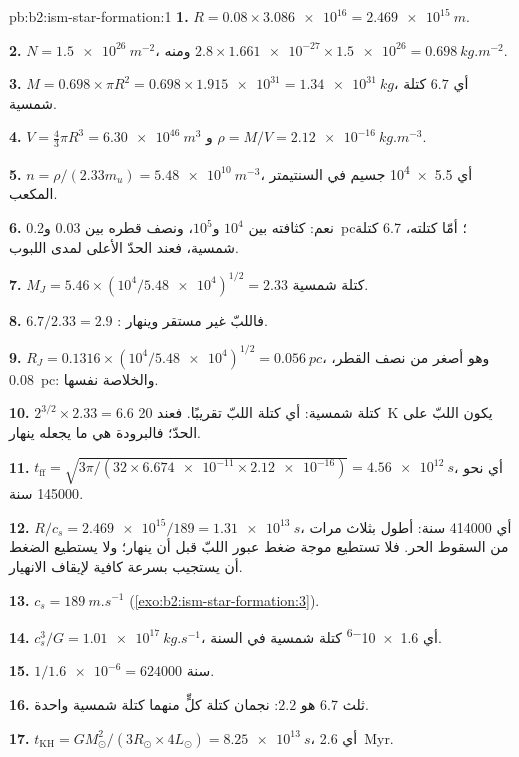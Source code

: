 \begin{solution}{pb:b2:ism-star-formation:1}
\textbf{1.} $R = 0.08\times\num{3.086e16} = \qty{2.469e15}{m}$.

\textbf{2.} $N = \qty{1.5e26}{m^{-2}}$، ومنه $2.8\times\num{1.661e-27}\times\num{1.5e26} =
\qty{0.698}{kg.m^{-2}}$.

\textbf{3.} $M = 0.698\times\pi R^2 = 0.698\times\num{1.915e31} = \qty{1.34e31}{kg}$،
أي $6.7$ كتلة شمسية.

\textbf{4.} $V = \tfrac43\pi R^3 = \qty{6.30e46}{m^3}$ و
$\rho = M/V = \qty{2.12e-16}{kg.m^{-3}}$.

\textbf{5.} $n = \rho/(2.33m_u) = \qty{5.48e10}{m^{-3}}$، أي \num{5.5e4} جسيم
في السنتيمتر المكعب.

\textbf{6.} نعم: كثافته بين $10^4$ و$10^5$، ونصف قطره بين 0.03
و\qty{0.2}{pc}؛ أمّا كتلته، 6.7 كتلة شمسية، فعند الحدّ الأعلى لمدى اللبوب.

\textbf{7.} $M_J = 5.46\times(10^4/\num{5.48e4})^{1/2} = 2.33$ كتلة شمسية.

\textbf{8.} $6.7/2.33 = 2.9$ : فاللبّ غير مستقر وينهار.

\textbf{9.} $R_J = 0.1316\times(10^4/\num{5.48e4})^{1/2} = \qty{0.056}{pc}$، وهو أصغر من
نصف القطر، \qty{0.08}{pc}: والخلاصة نفسها.

\textbf{10.} $2^{3/2}\times2.33 = 6.6$ كتلة شمسية: أي كتلة اللبّ تقريبًا. فعند
\qty{20}{K} يكون اللبّ على الحدّ؛ فالبرودة هي ما يجعله ينهار.

\textbf{11.} $t_{\mathrm{ff}} = \sqrt{3\pi/(32\times\num{6.674e-11}\times\num{2.12e-16})}
= \qty{4.56e12}{s}$، أي نحو \num{145000} سنة.

\textbf{12.} $R/c_s = \num{2.469e15}/189 = \qty{1.31e13}{s}$، أي \num{414000} سنة: أطول بثلاث
مرات من السقوط الحر. فلا تستطيع موجة ضغط عبور اللبّ قبل أن
ينهار؛ ولا يستطيع الضغط أن يستجيب بسرعة كافية لإيقاف الانهيار.

\textbf{13.} $c_s = \qty{189}{m.s^{-1}}$ (\cref{exo:b2:ism-star-formation:3}).

\textbf{14.} $c_s^3/G = \qty{1.01e17}{kg.s^{-1}}$، أي \num{1.6e-6} كتلة شمسية في السنة.

\textbf{15.} $1/\num{1.6e-6} = \num{624000}$ سنة.

\textbf{16.} ثلث 6.7 هو $2.2$: نجمان كتلة كلٍّ منهما كتلة شمسية واحدة.

\textbf{17.} $t_{\mathrm{KH}} = GM_\odot^2/(3R_\odot\times4L_\odot) = \qty{8.25e13}{s}$،
أي \qty{2.6}{Myr}.


\end{solution}
